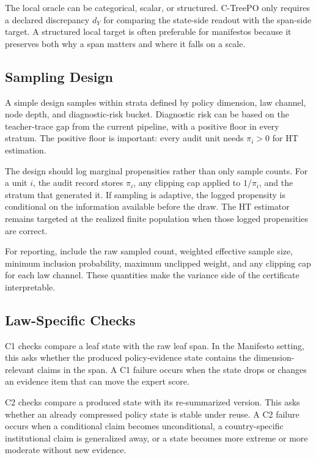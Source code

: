 The local oracle can be categorical, scalar, or structured. C-TreePO only
requires a declared discrepancy \(d_Y\) for comparing the state-side readout
with the span-side target. A structured local target is often preferable for
manifestos because it preserves both why a span matters and where it falls on
a scale.

\subsection{Sampling Design}

A simple design samples within strata defined by policy dimension, law channel,
node depth, and diagnostic-risk bucket. Diagnostic risk can be based on the
teacher-trace gap from the current pipeline, with a positive floor in every
stratum. The positive floor is important: every audit unit needs
\(\pi_i>0\) for HT estimation.

The design should log marginal propensities rather than only sample counts.
For a unit \(i\), the audit record stores \(\pi_i\), any clipping cap applied
to \(1/\pi_i\), and the stratum that generated it. If sampling is adaptive, the
logged propensity is conditional on the information available before the draw.
The HT estimator remains targeted at the realized finite population when those
logged propensities are correct.

For reporting, include the raw sampled count, weighted effective sample size,
minimum inclusion probability, maximum unclipped weight, and any clipping cap
for each law channel. These quantities make the variance side of the
certificate interpretable.

\subsection{Law-Specific Checks}

C1 checks compare a leaf state with the raw leaf span. In the Manifesto
setting, this asks whether the produced policy-evidence state contains the
dimension-relevant claims in the span. A C1 failure occurs when the state drops
or changes an evidence item that can move the expert score.

C2 checks compare a produced state with its re-summarized version. This asks
whether an already compressed policy state is stable under reuse. A C2 failure
occurs when a conditional claim becomes unconditional, a country-specific
institutional claim is generalized away, or a state becomes more extreme or
more moderate without new evidence.

